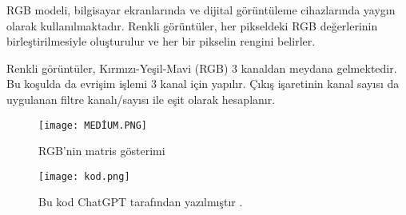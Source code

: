 \documentclass[12pt]{article}
\begin{document}
RGB modeli, bilgisayar ekranlarında ve dijital görüntüleme cihazlarında yaygın olarak kullanılmaktadır. Renkli görüntüler, her pikseldeki RGB değerlerinin birleştirilmesiyle oluşturulur ve her bir pikselin rengini belirler.

Renkli görüntüler, Kırmızı-Yeşil-Mavi (RGB) 3 kanaldan meydana gelmektedir. Bu koşulda da evrişim işlemi 3 kanal için yapılır. Çıkış işaretinin kanal sayısı da uygulanan filtre kanalı/sayısı ile eşit olarak hesaplanır.\cite{kizirak2018}
\newpage
\begin{figure}[h]
    \centering
    \texttt{[image: MEDİUM.PNG]}
    \caption{RGB'nin matris gösterimi\cite{kizirak2018}}
\end{figure}

\begin{figure}[h]
    \centering
    \texttt{[image: kod.png]}
    \caption{Bu kod ChatGPT tarafından yazılmıştır .\cite{chatgpt35}}
\end{figure}



\newpage
\printbibliography[title={Kaynakça}] 
\end{document}
